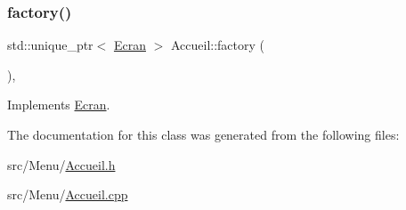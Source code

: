 \mbox{\label{class_accueil_a4448beee6ac1cc997afed55ebd4b9367}} 
\subsubsection{\texorpdfstring{factory()}{factory()}}
{\footnotesize\ttfamily std\+::unique\+\_\+ptr$<$ \mbox{\hyperlink{class_ecran}{Ecran}} $>$ Accueil\+::factory (\begin{DoxyParamCaption}{ }\end{DoxyParamCaption})\hspace{0.3cm}{\ttfamily [override]}, {\ttfamily [virtual]}}



Implements \mbox{\hyperlink{class_ecran_a016213731438ce2fb37831d8b0eeabed}{Ecran}}.



The documentation for this class was generated from the following files\+:\begin{DoxyCompactItemize}
\item 
src/\+Menu/\mbox{\hyperlink{_accueil_8h}{Accueil.\+h}}\item 
src/\+Menu/\mbox{\hyperlink{_accueil_8cpp}{Accueil.\+cpp}}\end{DoxyCompactItemize}
